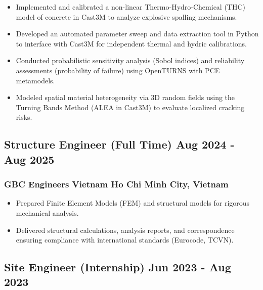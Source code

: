 \documentclass[11pt]{article} %
\begin{document}
\begin{itemize}
    \item Implemented and calibrated a non-linear Thermo-Hydro-Chemical (THC) model of concrete in Cast3M to analyze explosive spalling mechanisms.
    \item Developed an automated parameter sweep and data extraction tool in Python to interface with Cast3M for independent thermal and hydric calibrations.
    \item Conducted probabilistic sensitivity analysis (Sobol indices) and reliability assessments (probability of failure) using OpenTURNS with PCE metamodels.
    \item Modeled spatial material heterogeneity via 3D random fields using the Turning Bands Method (ALEA in Cast3M) to evaluate localized cracking risks.
\end{itemize}
\vspace{0.15cm}

\subsection{Structure Engineer (Full Time) \hfill Aug 2024 - Aug 2025}
\subsubsection{GBC Engineers Vietnam \hfill Ho Chi Minh City, Vietnam}
\begin{itemize}
    \item Prepared Finite Element Models (FEM) and structural models for rigorous mechanical analysis.
    \item Delivered structural calculations, analysis reports, and correspondence ensuring compliance with international standards (Eurocode, TCVN).
\end{itemize}

\vspace{0.15cm}

\subsection{Site Engineer (Internship) \hfill Jun 2023 - Aug 2023} %
\end{document}

